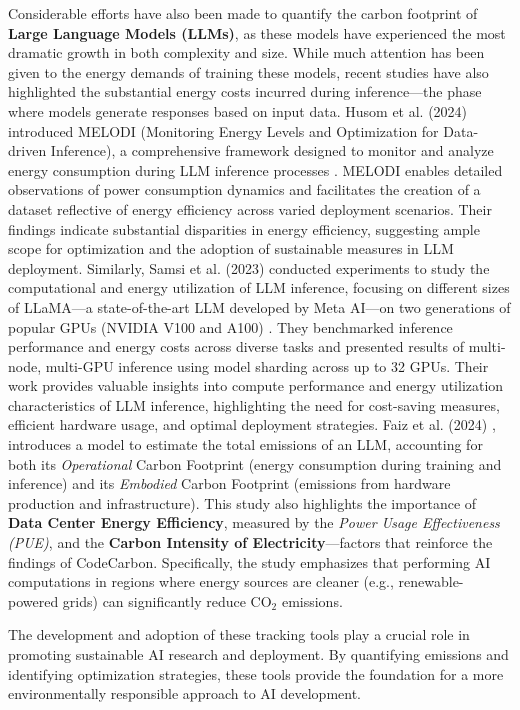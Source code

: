 \documentclass[a4paper,singleside,12pt]{report} %
\begin{document}
Considerable efforts have also been made to quantify the carbon footprint of \textbf{Large Language Models (LLMs)}, as these 
models have experienced the most dramatic growth in both complexity and size. While much attention has been given to the energy 
demands of training these models, recent studies have also highlighted the substantial energy costs incurred during inference—the 
phase where models generate responses based on input data. Husom et al. (2024) introduced MELODI (Monitoring Energy Levels and 
Optimization for Data-driven Inference), a comprehensive framework designed to monitor and analyze energy consumption during LLM 
inference processes \cite{husom2024priceprompting}. MELODI enables detailed observations of power consumption dynamics and 
facilitates the creation of a dataset reflective of energy efficiency across varied deployment scenarios. Their findings indicate 
substantial disparities in energy efficiency, suggesting ample scope for optimization and the adoption of sustainable measures 
in LLM deployment. Similarly, Samsi et al. (2023) conducted experiments to study the computational and energy utilization of 
LLM inference, focusing on different sizes of LLaMA—a state-of-the-art LLM developed by Meta AI—on two generations of popular 
GPUs (NVIDIA V100 and A100) \cite{samsi2023wordswattsbenchmarkingenergy}. They benchmarked inference performance and energy 
costs across diverse tasks and presented results of multi-node, multi-GPU inference using model sharding across up to 32 GPUs. 
Their work provides valuable insights into compute performance and energy utilization characteristics of LLM inference, 
highlighting the need for cost-saving measures, efficient hardware usage, and optimal deployment strategies. Faiz et al. (2024) 
\cite{faiz2024llmcarbon}, introduces a model to estimate the total emissions of an LLM, accounting for both its \textit{Operational} 
Carbon Footprint (energy consumption during training and inference) and its \textit{Embodied} Carbon Footprint (emissions from 
hardware production and infrastructure). This study also highlights the importance of \textbf{Data Center Energy Efficiency}, 
measured by the \textit{Power Usage Effectiveness (PUE)}, and the \textbf{Carbon Intensity of Electricity}—factors that reinforce 
the findings of CodeCarbon. Specifically, the study emphasizes that performing AI computations in regions where energy sources 
are cleaner (e.g., renewable-powered grids) can significantly reduce $\mathrm{CO_2}$ emissions. 

The development and adoption of these tracking tools play a crucial role in promoting sustainable AI research and deployment. 
By quantifying emissions and identifying optimization strategies, these tools provide the foundation for a more environmentally 
responsible approach to AI development.
 
\end{document}
